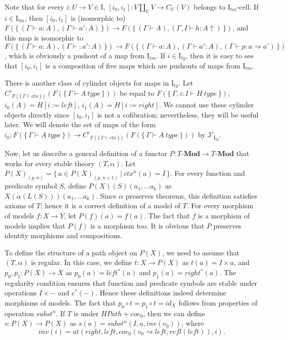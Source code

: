 \documentclass{mscs}
\newcommand{\repl}{:=}
\newcommand{\idtype}{\rightsquigarrow}
\newcommand{\cat}[1]{\mathbf{#1}}
\newcommand{\Mod}[1]{#1\text{-}\cat{Mod}}
\newcommand{\I}{\mathrm{I}}
\newcommand{\J}{\mathrm{J}}
\newcommand{\class}[2]{#1\text{-}\mathrm{#2}}
\newcommand{\Icell}[1][\I]{\class{#1}{cell}}
\newcommand{\cyli}{i}
\numberwithin{figure}{section}
\begin{document}
Note that for every $i : U \to V \in \I$, $[\cyli_0,\cyli_1] : V \amalg_U V \to C_U(V)$ belongs to $\Icell[\I_{tm}]$.
If $i \in \I_{tm}$, then $[\cyli_0,\cyli_1]$ is (isomorphic to) $F(\{\,(\Gamma \vdash a : A), (\Gamma \vdash a' : A)\,\}) \to F(\{\,(\Gamma \vdash A), (\Gamma, I \vdash h : A\!\uparrow)\,\})$,
and this map is isomorphic to $F(\{\,(\Gamma \vdash a : A), (\Gamma \vdash : a' : A)\,\}) \to F(\{\,(\Gamma \vdash a : A), (\Gamma \vdash a' : A), (\Gamma \vdash p : a \idtype a')\,\})$,
which is obviously a pushout of a map from $\I_{tm}$.
If $i \in \I_{ty}$, then it is easy to see that $[\cyli_0,\cyli_1]$ is a composition of five maps which are pushouts of maps from $\I_{tm}$.

There is another class of cylinder objects for maps in $\I_{ty}$.
Let $C'_{F(\{\,\Gamma \vdash ctx\,\})}(F(\{\,\Gamma \vdash A\ type\,\}))$ be equal to $F(\{\,\Gamma, i : I \vdash H\ type\,\})$, $\cyli_0(A) = H[i \repl left]$, $\cyli_1(A) = H[i \repl right]$.
We cannot use these cylinder objects directly since $[\cyli_0,\cyli_1]$ is not a cofibration; nevertheless, they will be useful later.
We will denote the set of maps of the form $\cyli_0 : F(\{\,\Gamma \vdash A\ type\,\}) \to C'_{F(\{\,\Gamma \vdash ctx\,\})}(F(\{\,\Gamma \vdash A\ type\,\}))$ by $\J'_{\I_{ty}}$.

Now, let us describe a general definition of a functor $P : \Mod{T} \to \Mod{T}$ that works for every stable theory $(T,\alpha)$.
Let $P(X)_{(p,n)} = \{\,a \in P(X)_{(p,n+1)}\ |\ ctx^n(a) = I\,\}$.
For every function and predicate symbol $S$, define $P(X)(S)(a_1, \ldots a_k)$ as $X(\alpha(L(S)))(a_1, \ldots a_k)$.
Since $\alpha$ preserves theorems, this definition satisfies axioms of $T$; hence it is a correct definition of a model of $T$.
For every morphism of models $f : X \to Y$, let $P(f)(a) = f(a)$.
The fact that $f$ is a morphism of models implies that $P(f)$ is a morphism too.
It is obvious that $P$ preserves identity morphisms and compositions.

To define the structure of a path object on $P(X)$, we need to assume that $(T,\alpha)$ is regular.
In this case, we define $t : X \to P(X)$ as $t(a) = I \times a$, and $p_0,p_1 : P(X) \to X$ as $p_0(a) = left^*(a)$ and $p_1(a) = right^*(a)$.
The regularity condition ensures that function and predicate symbols are stable under operations $I \times -$ and $c^*(-)$.
Hence these definitions indeed determine morphisms of models.
The fact that $p_0 \circ t = p_1 \circ t = id_X$ follows from properties of operation $subst^n$.
If $T$ is under $HPath + coe_0$, then we can define $s : P(X) \to P(X)$ as $s(a) = subst^n(I, a, inv(v_0))$, where
\[ inv(i) = at(right, left, coe_0(v_0 \idtype left, refl(left)), i). \]
\end{document}
